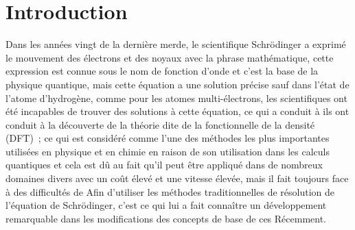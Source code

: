 \chapter*{Introduction} %

\label{Chapter0} 

\newcommand{\keyword}[1]{\textbf{#1}}
\newcommand{\tabhead}[1]{\textbf{#1}}
\newcommand{\code}[1]{\texttt{#1}}

Dans les années vingt de la dernière merde, le scientifique Schrödinger a exprimé le mouvement des électrons et des noyaux avec la phrase mathématique, cette expression est connue sous le nom de fonction d'onde et c'est la base de la physique quantique, mais cette équation a une solution précise sauf dans l'état de l'atome d'hydrogène, comme pour les atomes multi-électrons, les scientifiques ont été incapables de trouver des solutions à cette équation, ce qui a conduit à ils ont conduit à la découverte de la théorie dite de la fonctionnelle de la densité (DFT) ; ce qui est considéré comme l'une des méthodes les plus importantes utilisées en physique et en chimie en raison de son utilisation dans les calculs quantiques et cela est dû au fait qu'il peut être appliqué dans de nombreux domaines divers avec un coût élevé et une vitesse élevée, mais il fait toujours face à des difficultés de Afin d'utiliser les méthodes traditionnelles de résolution de l'équation de Schrödinger, c'est ce qui lui a fait connaître un développement remarquable dans les modifications des concepts de base de ces Récemment.